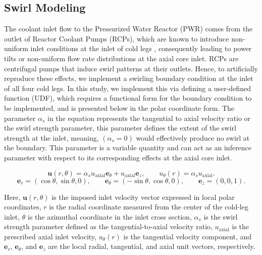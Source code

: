\documentclass[review]{elsarticle}
\theoremstyle{definition}
\theoremstyle{definition}
\theoremstyle{remark}
\begin{document}
\subsection{Swirl Modeling}
The coolant inlet flow to the Pressurized Water Reactor (PWR) comes from the outlet of Reactor Coolant Pumps (RCPs), which are known to introduce non-uniform inlet conditions at the inlet of cold legs \cite{SwirlManera}, consequently leading to power tilts or non-uniform flow rate distributions at the axial core inlet. RCPs are centrifugal pumps \cite{SwirlManera} that induce swirl patterns at their outlets. Hence, to artificially reproduce these effects, we implement a swirling boundary condition at the inlet of all four cold legs. In this study, we implement this via defining a user-defined function (UDF), which requires a functional form for the boundary condition to be implemented, and is presented below in the polar coordinate form. The parameter \textit{$\alpha_s$} in the equation represents the tangential to axial velocity ratio or the swirl strength parameter, this parameter defines the extent of the swirl strength at the inlet, meaning, $(\alpha_s=0)$ would effectively produce no swirl at the boundary. This parameter is a variable quantity and can act as an inference parameter with respect to its corresponding effects at the axial core inlet. 

\begin{equation}
    \mathbf{u}(r,\theta)
    =
    \alpha_s u_{\mathrm{axial}} \mathbf{e}_{\theta}
    +
    u_{\mathrm{axial}} \mathbf{e}_{z},
    \qquad
    u_\theta(r) = \alpha_s u_{\mathrm{axial}}.
\end{equation}
\begin{equation}
    \mathbf{e}_{r} = (\cos\theta,\sin\theta,0), \qquad
    \mathbf{e}_{\theta} = (-\sin\theta,\cos\theta,0), \qquad
    \mathbf{e}_{z} = (0,0,1).
\end{equation}

Here, \(\mathbf{u}(r,\theta)\) is the imposed inlet velocity vector expressed in local polar coordinates, \(r\) is the radial coordinate measured from the center of the cold-leg inlet, \(\theta\) is the azimuthal coordinate in the inlet cross section, \(\alpha_s\) is the swirl strength parameter defined as the tangential-to-axial velocity ratio, \(u_{\mathrm{axial}}\) is the prescribed axial inlet velocity, \(u_\theta(r)\) is the tangential velocity component, and \(\mathbf{e}_r\), \(\mathbf{e}_\theta\), and \(\mathbf{e}_z\) are the local radial, tangential, and axial unit vectors, respectively.
\end{document}
